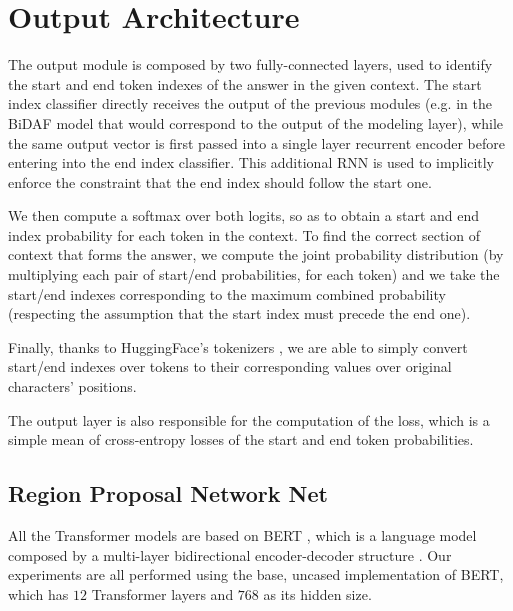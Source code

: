 \documentclass[a4paper,10pt]{report}
\begin{document}
\section{Output Architecture}\label{sec:output-architecture}

The output module is composed by two fully-connected layers, used to identify the start and end token indexes of the answer in the given context. The start index classifier directly receives the output of the previous modules (e.g. in the BiDAF model that would correspond to the output of the modeling layer), while the same output vector is first passed into a single layer recurrent encoder before entering into the end index classifier. This additional RNN is used to implicitly enforce the constraint that the end index should follow the start one.

We then compute a softmax over both logits, so as to obtain a start and end index probability for each token in the context. To find the correct section of context that forms the answer, we compute the joint probability distribution (by multiplying each pair of start/end probabilities, for each token) and we take the start/end indexes corresponding to the maximum combined probability (respecting the assumption that the start index must precede the end one).

Finally, thanks to HuggingFace's tokenizers \cite{tokenizers}, we are able to simply convert start/end indexes over tokens to their corresponding values over original characters' positions.

The output layer is also responsible for the computation of the loss, which is a simple mean of cross-entropy losses of the start and end token probabilities.

\subsection{Region Proposal Network Net}\label{subsec:rpn-net}
All the Transformer models are based on BERT \cite{bert}, which is a language model composed by a multi-layer bidirectional encoder-decoder structure \cite{transformers}. Our experiments are all performed using the base, uncased implementation of BERT, which has $12$ Transformer layers and $768$ as its hidden size.
\end{document}
